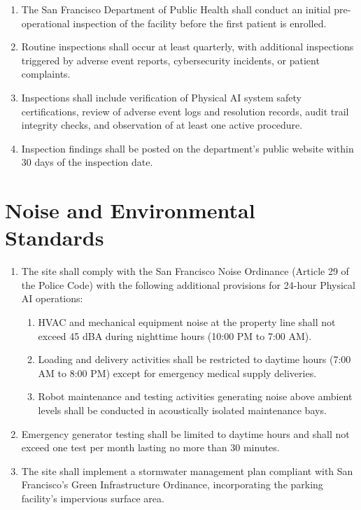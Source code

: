 \documentclass[11pt,letterpaper]{article}
\begin{document}
\begin{enumerate}[label=(\alph*)]
\item The San Francisco Department of Public Health shall conduct an initial
  pre-operational inspection of the facility before the first patient is
  enrolled.

\item Routine inspections shall occur at least quarterly, with additional
  inspections triggered by adverse event reports, cybersecurity incidents, or
  patient complaints.

\item Inspections shall include verification of Physical AI system safety
  certifications, review of adverse event logs and resolution records, audit
  trail integrity checks, and observation of at least one active procedure.

\item Inspection findings shall be posted on the department's public website
  within 30 days of the inspection date.
\end{enumerate}

\section{Noise and Environmental Standards}

\begin{enumerate}[label=(\alph*)]
\item The site shall comply with the San Francisco Noise Ordinance (Article 29
  of the Police Code) with the following additional provisions for 24-hour
  Physical AI operations:
  \begin{enumerate}[label=(\arabic*)]
  \item HVAC and mechanical equipment noise at the property line shall not
    exceed 45 dBA during nighttime hours (10:00 PM to 7:00 AM).
  \item Loading and delivery activities shall be restricted to daytime hours
    (7:00 AM to 8:00 PM) except for emergency medical supply deliveries.
  \item Robot maintenance and testing activities generating noise above ambient
    levels shall be conducted in acoustically isolated maintenance bays.
  \end{enumerate}

\item Emergency generator testing shall be limited to daytime hours and shall
  not exceed one test per month lasting no more than 30 minutes.

\item The site shall implement a stormwater management plan compliant with San
  Francisco's Green Infrastructure Ordinance, incorporating the parking
  facility's impervious surface area.
\end{enumerate}
\end{document}
